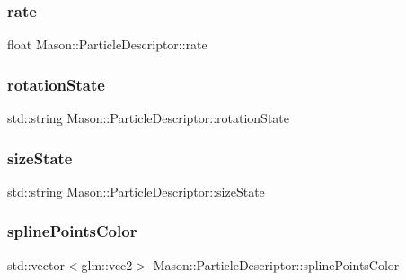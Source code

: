 \hypertarget{class_mason_1_1_particle_descriptor_a250f9c2c5b3fa119d0a38311e301fd2a}{}\label{class_mason_1_1_particle_descriptor_a250f9c2c5b3fa119d0a38311e301fd2a} 
\subsubsection{\texorpdfstring{rate}{rate}}
{\footnotesize\ttfamily float Mason\+::\+Particle\+Descriptor\+::rate}

\hypertarget{class_mason_1_1_particle_descriptor_ac192d2da527967c55804632bc6c0ca9e}{}\label{class_mason_1_1_particle_descriptor_ac192d2da527967c55804632bc6c0ca9e} 
\subsubsection{\texorpdfstring{rotation\+State}{rotationState}}
{\footnotesize\ttfamily std\+::string Mason\+::\+Particle\+Descriptor\+::rotation\+State}

\hypertarget{class_mason_1_1_particle_descriptor_a67edecae2a5df1c28ccc2f7cdb0a615f}{}\label{class_mason_1_1_particle_descriptor_a67edecae2a5df1c28ccc2f7cdb0a615f} 
\subsubsection{\texorpdfstring{size\+State}{sizeState}}
{\footnotesize\ttfamily std\+::string Mason\+::\+Particle\+Descriptor\+::size\+State}

\hypertarget{class_mason_1_1_particle_descriptor_a3a7588bd840bc8010f23bda75ec56e5d}{}\label{class_mason_1_1_particle_descriptor_a3a7588bd840bc8010f23bda75ec56e5d} 
\subsubsection{\texorpdfstring{spline\+Points\+Color}{splinePointsColor}}
{\footnotesize\ttfamily std\+::vector$<$glm\+::vec2$>$ Mason\+::\+Particle\+Descriptor\+::spline\+Points\+Color}

